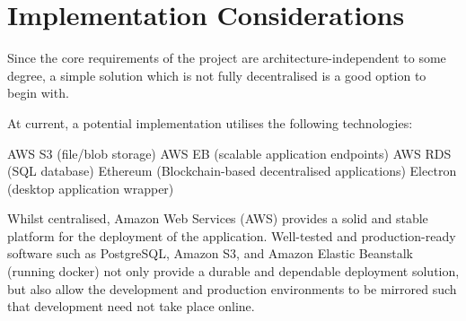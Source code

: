 \section{Implementation Considerations}

Since the core requirements of the project are architecture-independent to some degree, a simple solution which is not fully decentralised is a good option to begin with.

At current, a potential implementation utilises the following technologies:

\begin{outline}
  \1 AWS S3 (file/blob storage)
  \1 AWS EB (scalable application endpoints)
  \1 AWS RDS (SQL database)
  \1 Ethereum (Blockchain-based decentralised applications)
  \1 Electron (desktop application wrapper)
\end{outline}

Whilst centralised, Amazon Web Services (AWS) provides a solid and stable platform for the deployment of the application. Well-tested and production-ready software such as PostgreSQL, Amazon S3, and Amazon Elastic Beanstalk (running docker) not only provide a durable and dependable deployment solution, but also allow the development and production environments to be mirrored such that development need not take place online.






